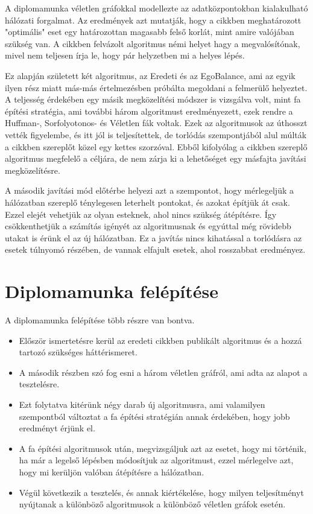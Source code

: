 \documentclass[12pt]{report}
\begin{document}
A diplomamunka véletlen gráfokkal modellezte az adatközpontokban kialakulható hálózati forgalmat.
Az eredmények azt mutatják, hogy a cikkben meghatározott "optimális" eset egy határozottan magasabb felső korlát, mint amire valójában szükség van.
A cikkben felvázolt algoritmus némi helyet hagy a megvalósítónak, mivel nem teljesen írja le, hogy pár helyzetben mi a helyes lépés.

Ez alapján született két algoritmus, az Eredeti és az EgoBalance, ami az egyik ilyen rész miatt más-más értelmezésben próbálta megoldani a felmerülő helyeztet.
A teljesség érdekében egy másik megközelítési módszer is vizsgálva volt, mint fa építési stratégia, ami további három algoritmust eredményezett, ezek rendre a Huffman-, Sorfolyotonos- és Véletlen fák voltak.
Ezek az algoritmusok az úthosszt vették figyelembe, és itt jól is teljesítettek, de torlódás szempontjából alul múlták a cikkben szereplőt közel egy kettes szorzóval.
Ebből kifolyólag a cikkben szereplő algoritmus megfelelő a céljára, de nem zárja ki a lehetőséget egy másfajta javítási megközelítésre. 

A második javítási mód előtérbe helyezi azt a szempontot, hogy mérlegeljük a hálózatban szereplő ténylegesen leterhelt pontokat, és azokat építjük át csak.
Ezzel elejét vehetjük az olyan esteknek, ahol nincs szükség átépítésre.
Így csökkenthetjük a számítás igényét az algoritmusnak és egyúttal még rövidebb utakat is érünk el az új hálózatban.
Ez a javítás nincs kihatással a torlódásra az esetek túlnyomó részében, de vannak elfajult esetek, ahol rosszabbat eredményez.

\section{Diplomamunka felépítése}

A diplomamunka felépítése több részre van bontva.
\begin{itemize}
	\item Először ismertetésre kerül az eredeti cikkben \cite{avin_demand-aware_nodate} publikált algoritmus és a hozzá tartozó szükséges háttérismeret.
	\item A második részben szó fog esni a három véletlen gráfról, ami adta az alapot a tesztelésre.
	\item Ezt folytatva kitérünk négy darab új algoritmusra, ami valamilyen szempontból változtat a fa építési stratégián annak érdekében, hogy jobb eredményt érjünk el.
	\item A fa építési algoritmusok után, megvizsgáljuk azt az esetet, hogy mi történik, ha már a legelső lépésben módosítjuk az algoritmust, ezzel mérlegelve azt, hogy mi kerüljön valóban átépítésre a hálózatban.
	\item Végül következik a tesztelés, és annak kiértékelése, hogy milyen teljesítményt nyújtanak a különböző algoritmusok a különböző véletlen gráfok esetén. 
\end{itemize}
\end{document}
